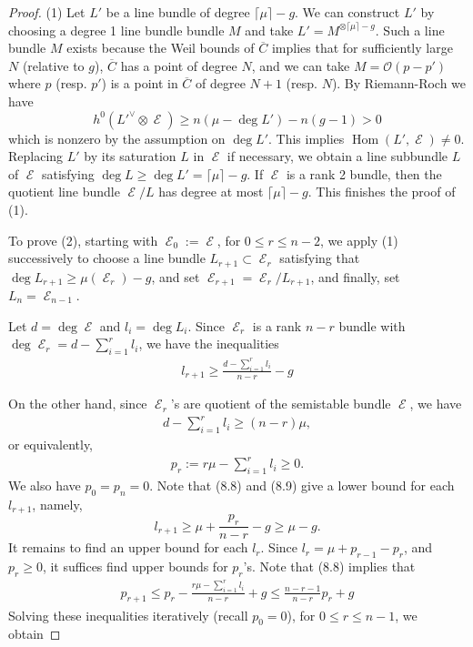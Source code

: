 \documentclass[11pt]{amsart}
\theoremstyle{definition}
\theoremstyle{remark}
\DeclareMathOperator{\E}{\mathcal{E}}
\DeclareMathOperator{\Hom}{Hom}
\numberwithin{equation}{section}
\begin{document}
\begin{proof}
(1) Let $L'$ be a line bundle of degree $\lceil\mu \rceil-g$. We can construct $L'$ by choosing a degree 1 line bundle bundle $M$ and take $L'=M^{\otimes \lceil \mu \rceil-g}$. Such a line bundle $M$ exists because the Weil bounds of $\overline{C}$ implies that for sufficiently large $N$ (relative to $g$), $\overline{C}$ has a point of degree $N$, and we can take $M= \mathcal{O}(p-p')$ where $p$ (resp. $p'$) is a point in $\overline{C}$ of degree $N+1$ (resp. $N$). By Riemann-Roch we have 
$$ h^0(L'^\vee \otimes \E) \geq n (\mu-\deg L') - n (g-1)>0$$
which is nonzero by the assumption on $\deg L'$. This implies $\Hom (L',\E) \neq 0$. Replacing $L'$ by its saturation $L$ in $\E$ if necessary, we obtain a line subbundle $L$ of $\E$ satisfying $\deg L \geq \deg L'=\lceil\mu \rceil-g$. If $\E$ is a rank 2 bundle, then the quotient line bundle $\E/L$ has degree at most $\lceil\mu\rceil -g$. This finishes the proof of (1).

To prove (2), starting with $\E_0:=\E$, for $0\leq r \leq n-2$, we apply (1) successively to choose a line bundle $L_{r+1} \subset \E_r$ satisfying that 
$\deg L_{r+1} \geq \mu(\E_{r})-g$, and set $\E_{r+1}=\E_r/L_{r+1}$, and finally, set $L_n=\E_{n-1}$.

Let $d=\deg \E$ and $l_i= \deg L_i$. Since  $\E_r$ is a rank $n-r$ bundle with $\deg \E_r = d - \sum_{i=1}^{r} l_i$, we have the inequalities
\begin{align}
   l_{r+1} \geq  \frac{d-\sum_{i=1}^{r} l_i }{n-r}-g 
\end{align}

On the other hand, since $\E_r$'s are quotient of the semistable bundle $\E$, we have
\begin{align}
    d - \sum_{i=1}^{r} l_i \geq (n-r)\mu,
\end{align} or equivalently,
\begin{align}
    p_r:= r\mu-\sum_{i=1}^r l_i \geq 0.
\end{align}
We also have $p_0=p_n=0$. Note that (8.8) and (8.9) give a lower bound for each $l_{r+1}$, namely, 
$$l_{r+1} \geq  \mu+\frac{p_r}{n-r}-g \geq \mu-g.$$ It remains to find an upper bound for each $l_r$. Since $l_r=\mu+p_{r-1} - p_r$, and $p_r \geq 0$, it suffices find upper bounds for $p_r$'s. Note that (8.8) implies that
\begin{align} p_{r+1} \leq p_r - \frac{r\mu -\sum_{i=1}^r l_i }{n-r} +g \leq \frac{n-r-1}{n-r} p_r +g \end{align}
Solving these inequalities iteratively (recall $p_0=0$), for $0 \leq r \leq n-1$, we obtain


\end{proof}
\end{document}
